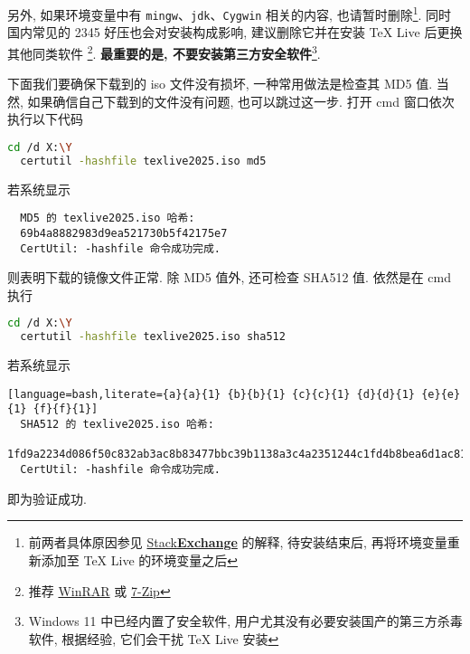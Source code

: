 另外, 如果环境变量中有 \texttt{mingw}、\texttt{jdk}、\texttt{Cygwin} 相关的内容,
也请暂时删除\footnote{前两者具体原因参见
\href{https://tex.stackexchange.com/questions/445086/error-installing-latest-version-of-tex-live-on-windows-10}{\textsf{Stack\textbf{Exchange}}}
的解释, 待安装结束后, 再将环境变量重新添加至 \TeX{} Live 的环境变量之后}.
同时国内常见的 2345 好压也会对安装构成影响,
建议删除它并在安装 \TeX{} Live 后更换其他同类软件%
\footnote{推荐 \href{http://www.winrar.com.cn/}{WinRAR}
或 \href{https://www.7-zip.org/}{7-Zip}}.
\textbf{最重要的是, 不要安装第三方安全软件}\footnote{Windows 11 中已经内置了安全软件,
用户尤其没有必要安装国产的第三方杀毒软件,
根据经验,
它们会干扰 \TeX{} Live 安装}.

下面我们要确保下载到的 iso 文件没有损坏, 一种常用做法是检查其 MD5 值.
当然, 如果确信自己下载到的文件没有问题, 也可以跳过这一步.
打开 \textsf{cmd} 窗口依次执行以下代码
\begin{lstlisting}[language = bash]
  cd /d X:\Y
  certutil -hashfile texlive2025.iso md5
\end{lstlisting}
若系统显示
\begin{lstlisting}
  MD5 的 texlive2025.iso 哈希:
  69b4a8882983d9ea521730b5f42175e7
  CertUtil: -hashfile 命令成功完成.
\end{lstlisting}
则表明下载的镜像文件正常.
除 MD5 值外,
还可检查 SHA512 值.
依然是在 \textsf{cmd} 执行
\begin{lstlisting}[language = bash]
  cd /d X:\Y
  certutil -hashfile texlive2025.iso sha512
\end{lstlisting}
若系统显示
\begin{lstlisting}[language=bash,literate={a}{a}{1} {b}{b}{1} {c}{c}{1} {d}{d}{1} {e}{e}{1} {f}{f}{1}]
  SHA512 的 texlive2025.iso 哈希:
  1fd9a2234d086f50c832ab3ac8b83477bbc39b1138a3c4a2351244c1fd4b8bea6d1ac81d4a5b0cba95f2e82c00f0d9df5b33189eb222e4bae5dae1523ef0da0e
  CertUtil: -hashfile 命令成功完成.
\end{lstlisting}
即为验证成功.

